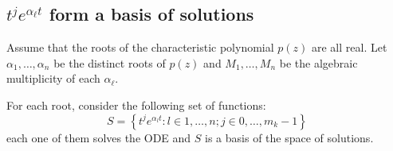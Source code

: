 \documentclass[12pt]{extarticle}
\numberwithin{equation}{section}
\begin{document}
\subsection{\texorpdfstring{$t^j e^{\alpha_\ell t}$ form a basis of solutions}{Basis of solutions}}

\begin{theorem}{}{}
    Assume that the roots of the characteristic polynomial $p(z)$ are all real.
    Let $\alpha_1, \dots, \alpha_n$ be the distinct roots of $p(z)$ and
    $M_1, \dots, M_n$ be the algebraic multiplicity of each $\alpha_\ell$.

    For each root, consider the following set of functions:
    \begin{equation}
        S = \left\{ t^j e^{\alpha_l t} : l \in 1, \dots, n; j \in 0, \dots, m_k -1 \right\}
    \end{equation}
    each one of them solves the ODE and $S$ is a basis of the space of solutions.
\end{theorem}
\end{document}
